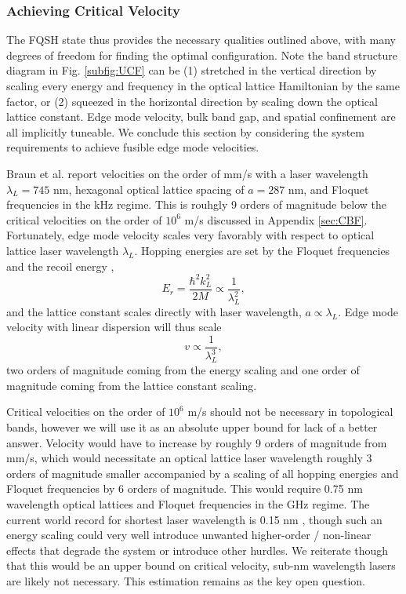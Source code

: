 \documentclass[onecolumn,
               superscriptaddress,
               floatfix,
               longbibliography, 
               showkeys,apl]{revtex4-2}
\begin{document}
\begin{appendices}
\subsubsection{Achieving Critical Velocity}\label{sec:critvel}

The FQSH state thus provides the necessary qualities outlined above, with many degrees of freedom for finding the optimal configuration. Note the band structure diagram in Fig. \ref{subfig:UCF} can be (1) stretched in the vertical direction by scaling every energy and frequency in the optical lattice Hamiltonian by the same factor, or (2) squeezed in the horizontal direction by scaling down the optical lattice constant. Edge mode velocity, bulk band gap, and spatial confinement are all implicitly tuneable. We conclude this section by considering the system requirements to achieve fusible edge mode velocities.

Braun et al. \cite{braun2023realspace} report velocities on the order of mm/s with a laser wavelength $\lambda_L=745$ nm, hexagonal optical lattice spacing of $a=287$ nm, and Floquet frequencies in the kHz regime. This is rouhgly 9 orders of magnitude below the critical velocities on the order of $10^6$ m/s discussed in Appendix \ref{sec:CBF}. Fortunately, edge mode velocity scales very favorably with respect to optical lattice laser wavelength $\lambda_L$. Hopping energies are set by the Floquet frequencies and the recoil energy \cite{Sch_fer_2020}, 
\begin{equation}
    E_r=\frac{\hbar^2k_L^2}{2M}\propto \frac{1}{\lambda_L^2},
\end{equation}
and the lattice constant scales directly with laser wavelength, $a \propto \lambda_L$. Edge mode velocity with linear dispersion will thus scale 
\begin{equation}
v \propto \frac{1}{\lambda_L^3},
\end{equation}
two orders of magnitude coming from the energy scaling and one order of magnitude coming from the lattice constant scaling.

Critical velocities on the order of $10^6$ m/s should not be necessary in topological bands, however we will use it as an absolute upper bound for lack of a better answer. Velocity would have to increase by roughly 9 orders of magnitude from mm/s, which would necessitate an optical lattice laser wavelength roughly 3 orders of magnitude smaller accompanied by a scaling of all hopping energies and Floquet frequencies by 6 orders of magnitude. This would require 0.75 nm wavelength optical lattices and Floquet frequencies in the GHz regime. The current world record for shortest laser wavelength is 0.15 nm \cite{Yoneda2015}, though such an energy scaling could very well introduce unwanted higher-order / non-linear effects that degrade the system or introduce other hurdles. We reiterate though that this would be an upper bound on critical velocity, sub-nm wavelength lasers are likely not necessary. This estimation remains as the key open question.


\end{appendices}
\end{document}
